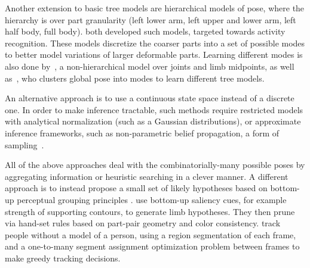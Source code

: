 Another extension to basic tree models are hierarchical models of pose, where 
the hierarchy is over part granularity (\eg left lower arm, left upper and 
lower arm, left half body, full body). \citet{wang2011,sun2011} both developed 
such models, targeted towards activity recognition.  These models discretize 
the coarser parts into a set of possible modes to better model variations of 
larger deformable parts.  Learning different modes is also done 
by~\citet{deva2011}, a non-hierarchical model over joints and limb midpoints, 
as well as~\citet{everingham2011}, who clusters global pose into modes to learn 
different tree models.

An alternative approach is to use a continuous state space instead of a 
discrete one.  In order to make inference tractable, such methods require 
restricted models with analytical normalization (such as a Gaussian 
distributions), or approximate inference frameworks, such as non-parametric 
belief propagation, a form of sampling~\citep{sigal-thesis}.  

All of the above approaches deal with the combinatorially-many possible poses 
by aggregating information or heuristic searching in a clever manner.  A 
different approach is to instead propose a small set of likely hypotheses based 
on bottom-up perceptual grouping principles \citep{mori04,praveen07}.  
\citet{mori04} use bottom-up saliency cues, for example strength of supporting 
contours, to generate limb hypotheses. They then prune via hand-set rules based 
on part-pair geometry and color consistency.  \citet{ren07} track people 
without a model of a person, using a region segmentation of each frame, and a 
one-to-many segment assignment optimization problem between frames to make 
greedy tracking decisions.
